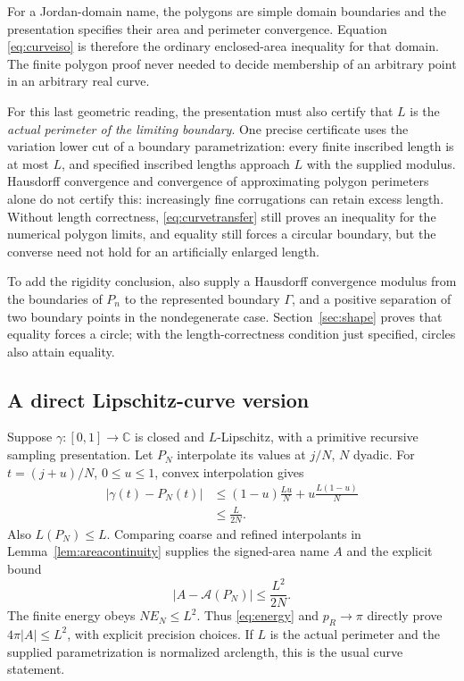\documentclass[11pt,a4paper]{article}
\theoremstyle{definition}
\newcommand{\C}{\mathbb C}
\newcommand{\Area}{\mathcal A}
\begin{document}
For a Jordan-domain name, the polygons are simple domain boundaries
and the presentation specifies their area and perimeter convergence.
Equation \eqref{eq:curveiso} is therefore the ordinary enclosed-area
inequality for that domain. The finite polygon proof never needed
to decide membership of an arbitrary point in an arbitrary real curve.

For this last geometric reading, the presentation must also certify
that \(L\) is the \emph{actual perimeter of the limiting boundary}.
One precise certificate uses the variation lower cut of a boundary
parametrization: every finite inscribed length is at most \(L\), and
specified inscribed lengths approach \(L\) with the supplied modulus.
Hausdorff convergence and convergence of approximating polygon
perimeters alone do not certify this: increasingly fine corrugations
can retain excess length. Without length correctness,
\eqref{eq:curvetransfer} still proves an inequality for the numerical
polygon limits, and equality still forces a circular boundary, but
the converse need not hold for an artificially enlarged length.

To add the rigidity conclusion, also supply a Hausdorff convergence
modulus from the boundaries of \(P_n\) to the represented boundary
\(\Gamma\), and a positive separation of two boundary points in the
nondegenerate case. Section~\ref{sec:shape} proves that equality forces
a circle; with the length-correctness condition just specified, circles
also attain equality.

\subsection{A direct Lipschitz-curve version}\label{sec:lipschitz}
Suppose \(\gamma:[0,1]\to\C\) is closed and \(L\)-Lipschitz,
with a primitive recursive sampling presentation. Let \(P_N\)
interpolate its values at \(j/N\), \(N\) dyadic.
For \(t=(j+u)/N\), \(0\le u\le1\), convex interpolation gives
\[
 \begin{aligned}
 |\gamma(t)-P_N(t)|
 &\le(1-u)\frac{Lu}{N}
       +u\frac{L(1-u)}{N}\\
 &\le \frac{L}{2N}.
 \end{aligned}
 \tag{8.7}\label{eq:lipschitzinterp}
\]
Also \(L(P_N)\le L\). Comparing coarse and refined interpolants
in Lemma~\ref{lem:areacontinuity} supplies the signed-area name \(A\)
and the explicit bound
\[
 |A-\Area(P_N)|\le\frac{L^2}{2N}.
 \tag{8.8}\label{eq:lipschitzarea}
\]
The finite energy obeys \(NE_N\le L^2\).
Thus \eqref{eq:energy} and \(p_R\to\pi\) directly prove
\(4\pi|A|\le L^2\), with explicit precision choices.
If \(L\) is the actual perimeter and the supplied parametrization is
normalized arclength, this is the usual curve statement.
\end{document}

